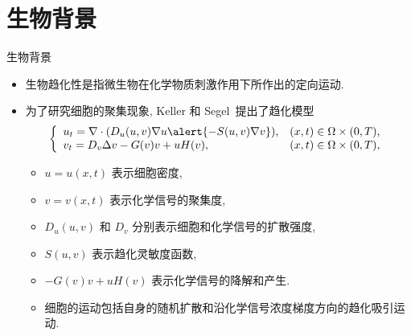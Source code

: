 \section{生物背景}

\begin{frame}{生物背景}
  
\begin{itemize}
    \item 生物趋化性是指微生物在化学物质刺激作用下所作出的定向运动.
    \item 为了研究细胞的\alert{聚集}现象, Keller 和 Segel~提出了趋化模型
\begin{equation*}\label{sys: general ks ch1}
	\left\{
	\begin{array}{ll}
		u_t = \nabla\cdot(D_u(u,v)\nabla u \alert{- S(u,v)\nabla v}), & (x, t)\in \Omega\times(0, T), \\
		v_t = D_v\Delta v  - G(v)v + uH(v),                   & (x, t)\in \Omega\times(0, T), \\
	\end{array}
	\right.
\end{equation*}
\begin{itemize}
\item $u = u(x, t)$ 表示细胞密度,
\item $v = v(x, t)$ 表示化学信号的聚集度,
\item $D_u(u,v)$ 和 $D_v$ 分别表示细胞和化学信号的扩散强度,
\item $S(u,v)$ 表示趋化灵敏度函数,
\item $-G(v)v + uH(v)$ 表示化学信号的降解和产生.
\item 细胞的运动包括自身的随机扩散和\alert{沿化学信号浓度梯度方向的趋化吸引运动}.
\end{itemize}
\end{itemize}
\end{frame}